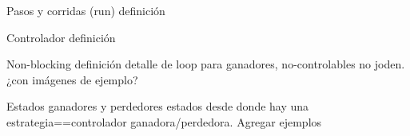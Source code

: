 \begin{frame}{Pasos y corridas (run)}
    definición
\end{frame}
\begin{frame}{Controlador}
    definición
\end{frame}
\begin{frame}{Non-blocking}
    definición detalle de loop para ganadores, no-controlables no joden. ¿con imágenes de ejemplo?
\end{frame}
\begin{frame}{Estados ganadores y perdedores}
    estados desde donde hay una estrategia==controlador ganadora/perdedora. Agregar ejemplos
\end{frame}
